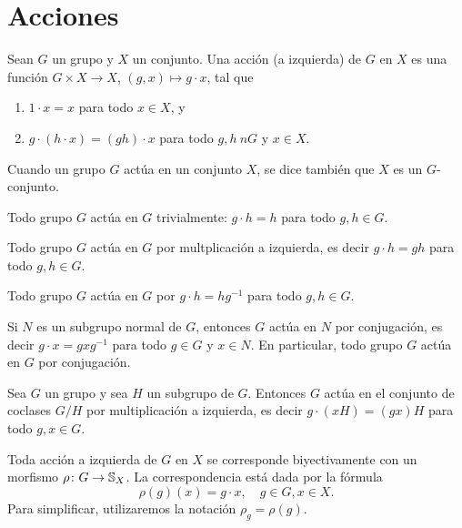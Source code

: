 \chapter{Acciones}

\begin{definition}
	Sean $G$ un grupo y $X$ un conjunto. Una acción (a izquierda) de $G$ en $X$ es una función
	$G\times X\to X$, $(g,x)\mapsto g\cdot x$, tal que
	\begin{enumerate}
		\item $1\cdot x=x$ para todo $x\in X$, y 
		\item $g\cdot (h\cdot x)=(gh)\cdot x$ para todo $g,h\ n G$ y $x\in X$.
	\end{enumerate}
\end{definition}

Cuando un grupo $G$ actúa en un conjunto $X$, se dice también que $X$ es un $G$-conjunto. 

\begin{example}
Todo grupo $G$ actúa en $G$ trivialmente: $g\cdot h=h$ para todo $g,h\in G$.	
\end{example}

\begin{example}
Todo grupo $G$ actúa en $G$ por multplicación a izquierda, es decir $g\cdot h=gh$ para todo $g,h\in G$.	
\end{example}

\begin{example}
Todo grupo $G$ actúa en $G$ por $g\cdot h=hg^{-1}$ para todo $g,h\in G$.	
\end{example}

\begin{example}
Si $N$ es un subgrupo normal de $G$, entonces $G$ actúa en $N$ por conjugación, es decir $g\cdot x=gxg^{-1}$ para todo $g\in G$ y $x\in N$. En particular, 
todo grupo $G$ actúa en $G$ por conjugación.		
\end{example}

\begin{example}
Sea $G$ un grupo y sea $H$ un subgrupo de $G$. Entonces $G$ actúa en el 
conjunto de coclases $G/H$ por multiplicación a izquierda, es decir
$g\cdot (xH)=(gx)H$ para todo $g,x\in G$. 
\end{example}

Toda acción a izquierda de $G$ en $X$ se corresponde biyectivamente con un morfismo 
$\rho\colon G\to\mathbb{S}_X$. La correspondencia está dada por la fórmula
\[
\rho(g)(x)=g\cdot x,\quad g\in G,x\in X.
\]
Para simplificar, utilizaremos la notación $\rho_g=\rho(g)$. 

